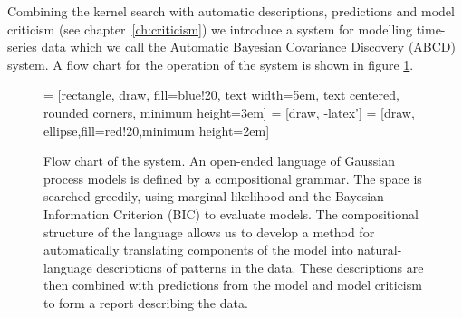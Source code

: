 Combining the kernel search with automatic descriptions, predictions and model criticism (see chapter~\ref{ch:criticism}) we introduce a system for modelling time-series data which we call the Automatic Bayesian Covariance Discovery (ABCD) system.
A flow chart for the operation of the system is shown in figure \ref{fig:description:flow}.

\begin{figure}[ht]
  \centering
   = [rectangle, draw, fill=blue!20, 
                       text width=5em, text centered, rounded corners, minimum height=3em]
   = [draw, -latex']
   = [draw, ellipse,fill=red!20,minimum height=2em]
    
  \caption{Flow chart of the \procedurename{} system.
  An open-ended language of Gaussian process models is defined by a compositional grammar.
  The space is searched greedily, using marginal likelihood and the Bayesian Information Criterion (BIC) to evaluate models.
  The  compositional structure of the language allows us to develop a method for automatically translating components of the model into natural-language descriptions of patterns in the data.
  These descriptions are then combined with predictions from the model and model criticism to form a report describing the data.}
  \label{fig:description:flow}
\end{figure}

